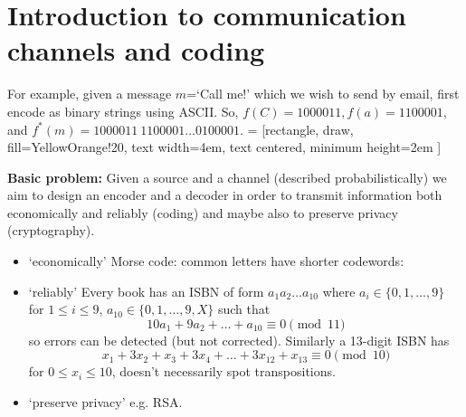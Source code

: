 \documentclass{article}
\begin{document}
\maketitle
\tableofcontents

\section*{Introduction to communication channels and coding}
For example, given a message $m$=`Call me!' which we wish to send by email, first encode as binary strings using ASCII.
So, $f(C) = 1000011, f(a) = 1100001$, and $f^*(m) = 1000011\ 1100001 \dots 0100001$.
 = [rectangle, draw, fill=YellowOrange!20,
    text width=4em,
    text centered,
    minimum height=2em
    ]
\begin{center}
\end{center}

\textbf{Basic problem:} Given a source and a channel (described probabilistically) we aim to design an encoder and a decoder in order to transmit information both economically and reliably (coding) and maybe also to preserve privacy (cryptography).

\begin{eg}
\leavevmode
\begin{itemize}
    \item `economically'
    Morse code: common letters have shorter codewords:
    \item `reliably'
    Every book has an ISBN of form $a_1 a_2 \dotsc a_{10}$ where $a_i \in \{0, 1, \dotsc, 9\}$ for $1 \leq i \leq 9$, $a_{10} \in \{0, 1, \dotsc, 9, X\}$ such that
    \begin{equation*}
        10 a_1 + 9 a_2 + \dotsc + a_{10} \equiv 0 \pmod{11}
    \end{equation*}
    so errors can be detected (but not corrected).
    Similarly a 13-digit ISBN has
    \begin{equation*}
        x_1 + 3 x_2 + x_3 + 3 x_4 + \dotsc + 3 x_{12} + x_{13} \equiv 0 \pmod{10}
    \end{equation*}
    for $0 \leq x_i \leq 10$, doesn't necessarily spot transpositions.
\item `preserve privacy' e.g. RSA.
\end{itemize}
\end{eg}
\end{document}
